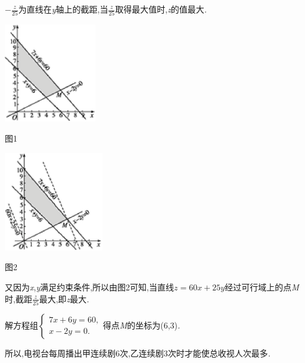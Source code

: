 \documentclass{article} %
\begin{document}
$-\frac{z}{25}$为直线在\textit{y}轴上的截距,当$\frac{z}{25}$取得最大值时,\textit{z}的值最大\textit{.}

 \includegraphics*[width=1.58in, height=1.71in, keepaspectratio=false]{image1765}

 图1

 \includegraphics*[width=1.71in, height=1.71in, keepaspectratio=false]{image1766}

 图2



又因为\textit{x},\textit{y}满足约束条件,所以由图2可知,当直线$z=60x+25y$经过可行域上的点\textit{M}时,截距$\frac{z}{25}$最大,即\textit{z}最大\textit{.}

解方程组$
\begin{cases}
7x+6y=60,\\
x-2y=0.
\end{cases}$得点\textit{M}的坐标为(6,3)\textit{.}

所以,电视台每周播出甲连续剧6次,乙连续剧3次时才能使总收视人次最多\textit{.}
\end{document}
